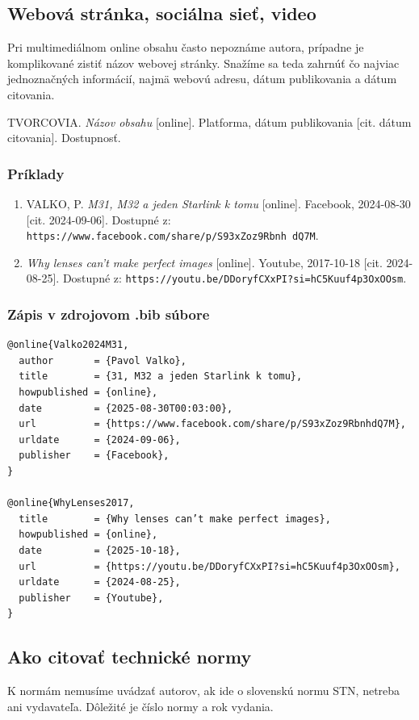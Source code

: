 \subsection{Webová stránka, sociálna sieť, video}
Pri multimediálnom online obsahu často nepoznáme autora,
prípadne je komplikované zistiť názov webovej stránky.
Snažíme sa teda zahrnúť čo najviac jednoznačných informácií,
najmä webovú adresu, dátum publikovania a dátum citovania.
\begin{trivlist}
  \item TVORCOVIA. \textit{Názov obsahu} [online]. Platforma, dátum publikovania [cit. dátum citovania]. Dostupnosť.
\end{trivlist}

\subsubsection*{\normalsize Príklady}
\begin{enumerate}
  \item VALKO, P. \textit{M31, M32 a jeden Starlink k tomu} [online]. Facebook, 2024-08-30 [cit. 2024-09-06]. Dostupné z: \texttt{https://www.facebook.com/share/p/S93xZoz9Rbnh
  dQ7M}.

  \item \textit{Why lenses can't make perfect images} [online]. Youtube, 2017-10-18 [cit. 2024-08-25]. Dostupné z: \texttt{https://youtu.be/DDoryfCXxPI?si=hC5Kuuf4p3OxOOsm}.
\end{enumerate}

\subsubsection*{\normalsize Zápis v zdrojovom .bib súbore}
\begin{verbatim}
@online{Valko2024M31,
  author       = {Pavol Valko},
  title        = {31, M32 a jeden Starlink k tomu},
  howpublished = {online},
  date         = {2025-08-30T00:03:00},
  url          = {https://www.facebook.com/share/p/S93xZoz9RbnhdQ7M},
  urldate      = {2024-09-06},
  publisher    = {Facebook},
}

@online{WhyLenses2017,
  title        = {Why lenses can’t make perfect images},
  howpublished = {online},
  date         = {2025-10-18},
  url          = {https://youtu.be/DDoryfCXxPI?si=hC5Kuuf4p3OxOOsm},
  urldate      = {2024-08-25},
  publisher    = {Youtube},
}
\end{verbatim}

\subsection{Ako citovať technické normy}
K normám nemusíme uvádzať autorov, ak ide o slovenskú normu STN, netreba ani vydavateľa. Dôležité je číslo normy a rok vydania.

